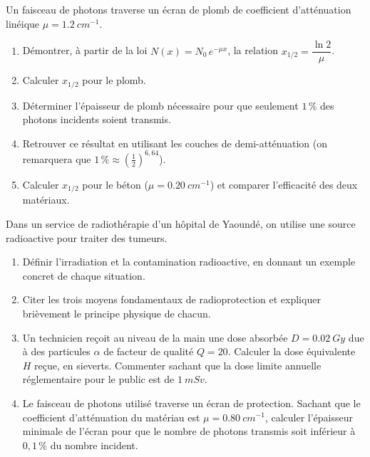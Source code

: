 \documentclass[11pt]{article}
\newcommand{\cle}[1]{{\popxbold\color{popdark}#1}}
\newcounter{popsec}
\newcounter{popsub}
\newcommand{\courssub}[1]{%
  \stepcounter{popsub}%
  \par\vspace{9pt}\noindent{\popxbold\fontsize{11.5}{13}\selectfont\color{popink}{\color{poporange}\thepopsec.\thepopsub}\hspace{6pt}#1}\par\nopagebreak\vspace{4pt}
}
\begin{document}
\begin{exercice}
Un faisceau de photons traverse un écran de plomb de coefficient d'atténuation linéique $\mu = \SI{1,2}{cm^{-1}}$.
\begin{enumerate}
\item Démontrer, à partir de la loi $N(x) = N_0\,e^{-\mu x}$, la relation $x_{1/2} = \dfrac{\ln 2}{\mu}$.
\item Calculer $x_{1/2}$ pour le plomb.
\item Déterminer l'épaisseur de plomb nécessaire pour que seulement $1\,\%$ des photons incidents soient transmis.
\item Retrouver ce résultat en utilisant les couches de demi-atténuation (on remarquera que $1\,\% \approx \left(\tfrac{1}{2}\right)^{6,64}$).
\item Calculer $x_{1/2}$ pour le béton ($\mu = \SI{0,20}{cm^{-1}}$) et comparer l'efficacité des deux matériaux.
\end{enumerate}
\end{exercice}

\courssub{Je me prépare au Bac}

\begin{exercice}
Dans un service de radiothérapie d'un hôpital de Yaoundé, on utilise une source radioactive pour traiter des tumeurs.
\begin{enumerate}
\item Définir l'\cle{irradiation} et la \cle{contamination} radioactive, en donnant un exemple concret de chaque situation.
\item Citer les trois moyens fondamentaux de radioprotection et expliquer brièvement le principe physique de chacun.
\item Un technicien reçoit au niveau de la main une dose absorbée $D = \SI{0,02}{Gy}$ due à des particules $\alpha$ de facteur de qualité $Q = 20$. Calculer la dose équivalente $H$ reçue, en sieverts. Commenter sachant que la dose limite annuelle réglementaire pour le public est de $\SI{1}{mSv}$.
\item Le faisceau de photons utilisé traverse un écran de protection. Sachant que le coefficient d'atténuation du matériau est $\mu = \SI{0,80}{cm^{-1}}$, calculer l'épaisseur minimale de l'écran pour que le nombre de photons transmis soit inférieur à $0,1\,\%$ du nombre incident.
\end{enumerate}
\end{exercice}
\end{document}
